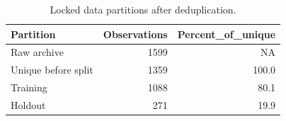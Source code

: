 \begin{table}

\caption{\label{tab:p1-split-summary}Locked data partitions after deduplication.}
\centering
\begin{tabular}[t]{lrr}
\toprule
Partition & Observations & Percent\_of\_unique\\
\midrule
Raw archive & 1599 & NA\\
Unique before split & 1359 & 100.0\\
Training & 1088 & 80.1\\
Holdout & 271 & 19.9\\
\bottomrule
\end{tabular}
\end{table}
